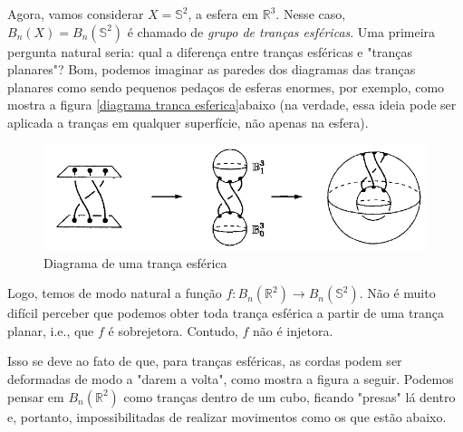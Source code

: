 	\par\vspace{0.3cm} Agora, vamos considerar $X = \mathbb{S}^2$, a esfera em $\mathbb{R}^3$. Nesse caso, $B_n(X) = B_n(\mathbb{S}^2)$ é chamado de \textit{grupo de tranças esféricas}. Uma primeira pergunta natural seria: qual a diferença entre tranças esféricas e "tranças planares"? Bom, podemos imaginar as paredes dos diagramas das tranças planares como sendo pequenos pedaços de esferas enormes, por exemplo, como mostra a figura \eqref{diagrama tranca esferica}abaixo (na verdade, essa ideia pode ser aplicada a tranças em qualquer superfície, não apenas na esfera).
	
	\begin{figure}[H]
		\begin{center}
			\includegraphics[width=12cm]{Images/diagrama_tranca_esferica.png}
		\end{center}\caption{Diagrama de uma trança esférica}
		\label{diagrama tranca esferica}
	\end{figure}
	\par\vspace{0.3cm} Logo, temos de modo natural a função $f: B_n(\mathbb{R}^2)\to B_n(\mathbb{S}^2)$. Não é muito difícil perceber que podemos obter toda trança esférica a partir de uma trança planar, i.e., que $f$ é sobrejetora. Contudo, $f$ não é injetora.
	\par\vspace{0.3cm} Isso se deve ao fato de que, para tranças esféricas, as cordas podem ser deformadas de modo a "darem a volta", como mostra a figura a seguir. Podemos pensar em $B_n(\mathbb{R}^2)$ como tranças dentro de um cubo, ficando "presas" lá dentro e, portanto, impossibilitadas de realizar movimentos como os que estão abaixo.
	
